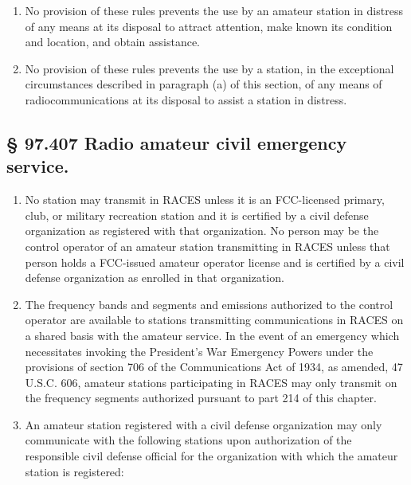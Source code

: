\documentclass[
  letterpaper,
  DIV=11,
  numbers=noendperiod]{scrreport}
\begin{document}
\begin{enumerate}
\def\labelenumi{(\alph{enumi})}
\item
  No provision of these rules prevents the use by an amateur station in
  distress of any means at its disposal to attract attention, make known
  its condition and location, and obtain assistance.
\item
  No provision of these rules prevents the use by a station, in the
  exceptional circumstances described in paragraph (a) of this section,
  of any means of radiocommunications at its disposal to assist a
  station in distress.
\end{enumerate}

\hypertarget{97.407}{%
\subsection*{§ 97.407 Radio amateur civil emergency
service.}\label{97.407}}

\begin{enumerate}
\def\labelenumi{(\alph{enumi})}
\item
  No station may transmit in RACES unless it is an FCC-licensed primary,
  club, or military recreation station and it is certified by a civil
  defense organization as registered with that organization. No person
  may be the control operator of an amateur station transmitting in
  RACES unless that person holds a FCC-issued amateur operator license
  and is certified by a civil defense organization as enrolled in that
  organization.
\item
  The frequency bands and segments and emissions authorized to the
  control operator are available to stations transmitting communications
  in RACES on a shared basis with the amateur service. In the event of
  an emergency which necessitates invoking the President's War Emergency
  Powers under the provisions of section 706 of the Communications Act
  of 1934, as amended, 47 U.S.C. 606, amateur stations participating in
  RACES may only transmit on the frequency segments authorized pursuant
  to part 214 of this chapter.
\item
  An amateur station registered with a civil defense organization may
  only communicate with the following stations upon authorization of the
  responsible civil defense official for the organization with which the
  amateur station is registered:
\end{enumerate}
\end{document}
